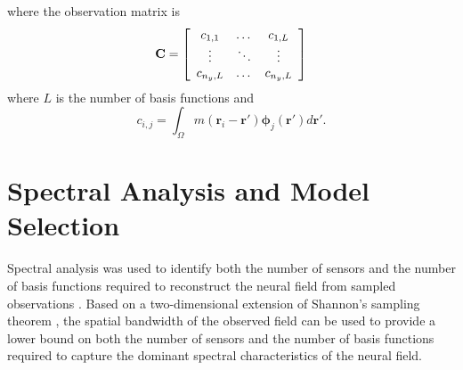 \documentclass[12pt]{iopart}
\begin{document}
where the observation matrix is 
\begin{equation}
	\mathbf{C} = \left[
	\begin{array}{{ccc}} 
		c_{1,1} & \dots & c_{1,L} \\
		\vdots & \ddots & \vdots \\
		c_{n_y,L} & \dots & c_{n_y,L} 
	\end{array}
	\right] 
\end{equation}
where $L$ is the number of basis functions and 
\begin{equation}
	c_{i,j} = \int_{\Omega}m(\mathbf{r}_i - \mathbf{r}')\boldsymbol{\phi}_j(\mathbf{r}')d\mathbf{r}'. 
\end{equation}

\section{Spectral Analysis and Model Selection}\label{SpectralAnalysisSection} Spectral analysis was used to identify both the number of sensors and the number of basis functions required to reconstruct the neural field from sampled observations \cite{Sanner1992,Scerri2009}. Based on a two-dimensional extension of Shannon's sampling theorem \cite{Peterson1962}, the spatial bandwidth of the observed field can be used to provide a lower bound on both the number of sensors and the number of basis functions required to capture the dominant spectral characteristics of the neural field.
\end{document}
